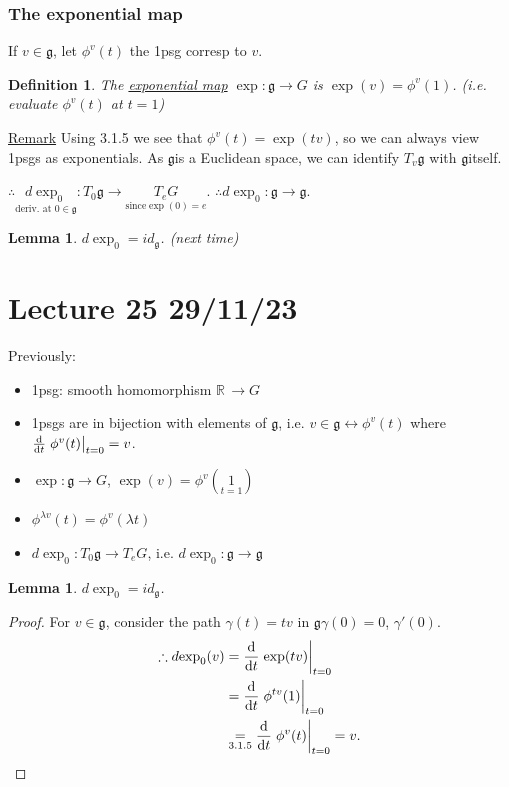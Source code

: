 \documentclass[12pt,a4paper]{article}
\newcommand{\rR}{\ensuremath{\mathbb{R}\,}}
\newcommand{\tqn}[2]{\ensuremath{T_{#1} {#2}}}
\newcommand{\dgq}[2]{\ensuremath{d {#1}_{#2}}}
\newcommand{\lalg}{\ensuremath{\mathfrak{g}}}
\newcommand{\ul}[1]{\underline{#1}}
\newtheorem{defn}[thm]{Definition}
\newtheorem{lemma}[thm]{Lemma}
\begin{document}
\subsubsection{The exponential map}
If $v\in \lalg$, let $\phi^v(t)$ the 1psg corresp to $v$.
\begin{defn}
The \ul{exponential map} $\exp:\lalg\to G$ is $\exp(v)=\phi^v(1)$. (i.e. evaluate $\phi^v(t)$ at $t=1$)
\end{defn}
\ul{Remark} Using 3.1.5 we see that $\phi^v(t)=\exp(tv)$, so we can always view 1psgs as exponentials.
As \lalg is a Euclidean space, we can identify $\tqn{v}{\lalg}$ with \lalg itself.

$\therefore \underset{\text{deriv. at } 0 \in\lalg}{\dgq{\exp}{0}}:\tqn{0}{\lalg}\to \underset{\text{since} \exp(0)=e}{\tqn{e}{G}}$.
$\therefore \dgq{\exp}{0}:\lalg\to \lalg.$
\begin{lemma}
$ \dgq{\exp}{0}=id_{\lalg}$. (next time)
\end{lemma}

\section{Lecture 25 29/11/23}
Previously:
\begin{itemize}
\item 1psg: smooth homomorphism $\rR\to G$
\item 1psgs are in bijection with elements of \lalg, i.e. $v\in \lalg \leftrightarrow \phi^v(t)$ where $\dv{t}\eval{\phi^v(t)}_{t=0}=v$.
\item $\exp:\lalg\to G$, $\exp(v)=\phi^v(\underset{t=1}{1})$
\item $\phi^{\lambda v}(t)=\phi^v(\lambda t)$
\item $\dgq{\exp}{0}:\tqn{0}{\lalg}\to \tqn{e}{G}$, i.e. $\dgq{\exp}{0}:\lalg\to \lalg$
\end{itemize}
\addtocounter{thm}{-1}
\begin{lemma}
$ \dgq{\exp}{0}=id_{\lalg}$.
\end{lemma}
\begin{proof}
For $v\in \lalg$, consider the path $\gamma(t)=tv$ in \lalg $\gamma(0)=0$, $\gamma'(0)$.
\begin{align*}
\therefore \dgq{\exp}{0}(v)&=\dv{t}\eval{\exp(tv)}_{t=0}\\
&= \dv{t}\eval{\phi^{tv}(1)}_{t=0}\\
&\underset{3.1.5}{=} \dv{t}\eval{\phi^{v}(t)}_{t=0}=v.
\end{align*}
\end{proof}
\end{document}

